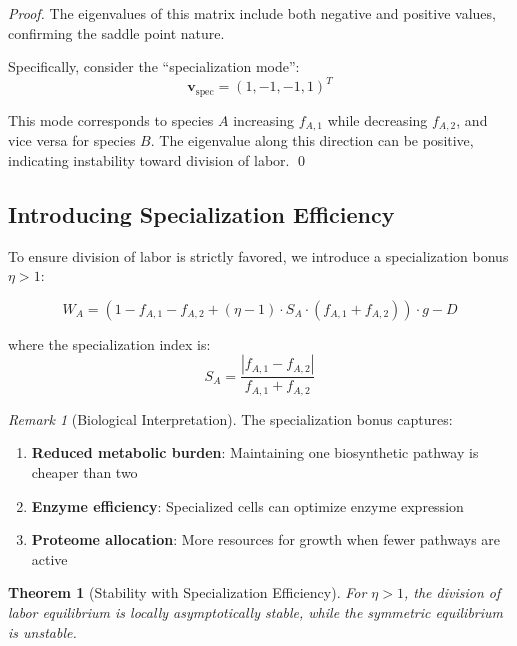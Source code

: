\documentclass[11pt]{article}
\newtheorem{theorem}{Theorem}
\theoremstyle{definition}
\theoremstyle{remark}
\newtheorem{remark}{Remark}
\begin{document}
\begin{proof}
The eigenvalues of this matrix include both negative and positive values, confirming the saddle point nature.

Specifically, consider the ``specialization mode'':
\begin{equation}
\mathbf{v}_{\text{spec}} = (1, -1, -1, 1)^T
\end{equation}

This mode corresponds to species $A$ increasing $f_{A,1}$ while decreasing $f_{A,2}$, and vice versa for species $B$. The eigenvalue along this direction can be positive, indicating instability toward division of labor. \qed
\end{proof}

\subsection{Introducing Specialization Efficiency}

To ensure division of labor is strictly favored, we introduce a specialization bonus $\eta > 1$:

\begin{equation}
W_A = \left(1 - f_{A,1} - f_{A,2} + (\eta - 1) \cdot S_A \cdot (f_{A,1} + f_{A,2})\right) \cdot g - D
\end{equation}

where the specialization index is:
\begin{equation}
S_A = \frac{|f_{A,1} - f_{A,2}|}{f_{A,1} + f_{A,2}}
\end{equation}

\begin{remark}[Biological Interpretation]
The specialization bonus captures:
\begin{enumerate}
    \item \textbf{Reduced metabolic burden}: Maintaining one biosynthetic pathway is cheaper than two
    \item \textbf{Enzyme efficiency}: Specialized cells can optimize enzyme expression
    \item \textbf{Proteome allocation}: More resources for growth when fewer pathways are active
\end{enumerate}
\end{remark}

\begin{theorem}[Stability with Specialization Efficiency]
For $\eta > 1$, the division of labor equilibrium is locally asymptotically stable, while the symmetric equilibrium is unstable.
\end{theorem}
\end{document}
